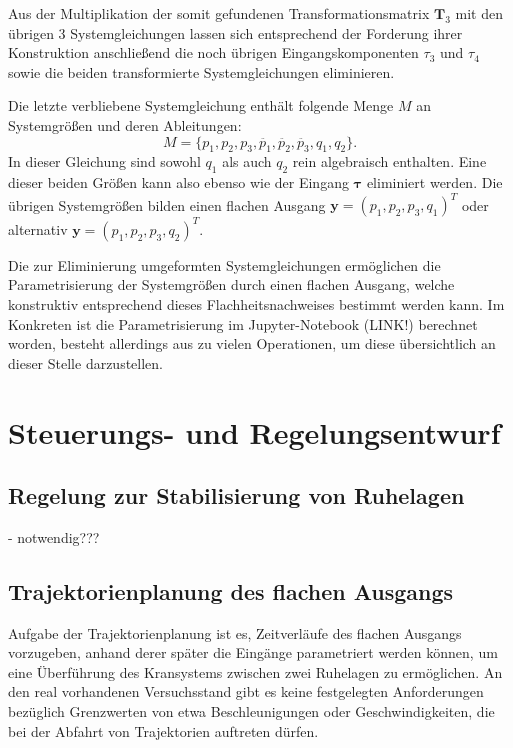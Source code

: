 Aus der Multiplikation der somit gefundenen Transformationsmatrix $\mathbf{T}_3$ mit den übrigen 3 Systemgleichungen lassen sich entsprechend der Forderung ihrer Konstruktion anschließend die noch übrigen Eingangskomponenten $\tau_{3}$ und $\tau_{4}$ sowie die beiden transformierte Systemgleichungen eliminieren.

Die letzte verbliebene Systemgleichung enthält folgende Menge $M$ an Systemgrößen und deren Ableitungen:
\begin{equation}
	M = \{p_1, p_2, p_3, \ddot{p_1}, \ddot{p_2}, \ddot{p_3}, q_1, q_2 \}.
\end{equation}
In dieser Gleichung sind sowohl $q_1$ als auch $q_2$ rein algebraisch enthalten. Eine dieser beiden Größen kann also ebenso wie der Eingang $\mathbf{\tau}$ eliminiert werden. Die übrigen Systemgrößen bilden einen flachen Ausgang $\mathbf{y} = (p_1, p_2, p_3, q_1)^T$ oder alternativ $\mathbf{y} = (p_1, p_2, p_3, q_2)^T$. 

Die zur Eliminierung umgeformten Systemgleichungen ermöglichen die Parametrisierung der Systemgrößen durch einen flachen Ausgang, welche konstruktiv entsprechend dieses Flachheitsnachweises bestimmt werden kann. Im Konkreten ist die Parametrisierung im Jupyter-Notebook (LINK!) berechnet worden, besteht allerdings aus zu vielen Operationen, um diese übersichtlich an dieser Stelle darzustellen.

\chapter{Steuerungs- und Regelungsentwurf}

\section{Regelung zur Stabilisierung von Ruhelagen}
- notwendig???

\section{Trajektorienplanung des flachen Ausgangs}
Aufgabe der Trajektorienplanung ist es, Zeitverläufe des flachen Ausgangs vorzugeben, anhand derer später die Eingänge parametriert werden können, um eine Überführung des Kransystems zwischen zwei Ruhelagen zu ermöglichen. An den real vorhandenen Versuchsstand gibt es keine festgelegten Anforderungen bezüglich Grenzwerten von etwa Beschleunigungen oder Geschwindigkeiten, die bei der Abfahrt von Trajektorien auftreten dürfen.

